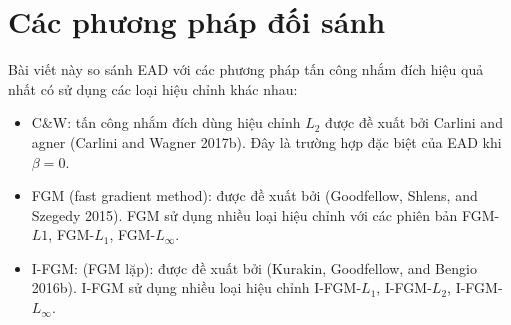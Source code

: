 \section{Các phương pháp đối sánh}
Bài viết này so sánh EAD với các phương pháp tấn công nhắm đích hiệu quả nhất có sử dụng 
các loại hiệu chỉnh khác nhau:
\begin{itemize}
    \item C\&W: tấn công nhắm đích dùng hiệu chỉnh $L_2$ được đề xuất bởi Carlini and agner (Carlini and Wagner 2017b). Đây là trường hợp đặc biệt của EAD khi $\beta = 0$.
    \item FGM (fast gradient method): được đề xuất bởi (Goodfellow, Shlens, and Szegedy 2015). FGM sử dụng nhiều loại hiệu chỉnh với các phiên bản FGM-$L1$, FGM-$L_1$, FGM-$L_{\infty}$.
    \item I-FGM: (FGM lặp): được đề xuất bởi (Kurakin, Goodfellow, and Bengio 2016b). I-FGM sử dụng nhiều loại hiệu chỉnh I-FGM-$L_1$, I-FGM-$L_2$, I-FGM-$L_{\infty}$.
\end{itemize}